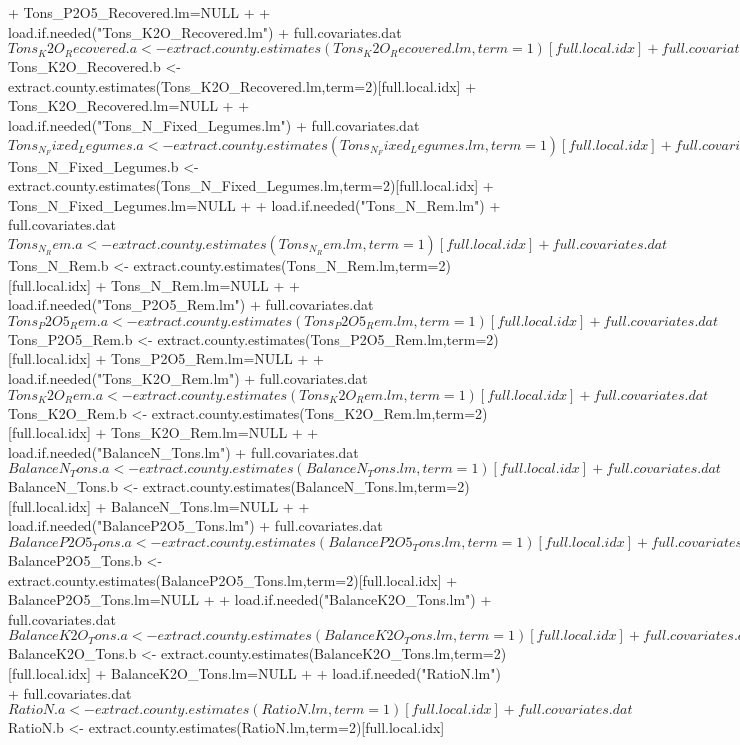 \documentclass{report}
\begin{document}
\begin{Schunk}
\begin{Sinput}
+    Tons_P2O5_Recovered.lm=NULL
+    
+    load.if.needed("Tons_K2O_Recovered.lm")
+    full.covariates.dat$Tons_K2O_Recovered.a <- extract.county.estimates(Tons_K2O_Recovered.lm,term=1)[full.local.idx]
+    full.covariates.dat$Tons_K2O_Recovered.b <- extract.county.estimates(Tons_K2O_Recovered.lm,term=2)[full.local.idx]
+    Tons_K2O_Recovered.lm=NULL
+    
+    load.if.needed("Tons_N_Fixed_Legumes.lm")
+    full.covariates.dat$Tons_N_Fixed_Legumes.a <- extract.county.estimates(Tons_N_Fixed_Legumes.lm,term=1)[full.local.idx]
+    full.covariates.dat$Tons_N_Fixed_Legumes.b <- extract.county.estimates(Tons_N_Fixed_Legumes.lm,term=2)[full.local.idx]
+    Tons_N_Fixed_Legumes.lm=NULL
+    
+    load.if.needed("Tons_N_Rem.lm")
+    full.covariates.dat$Tons_N_Rem.a <- extract.county.estimates(Tons_N_Rem.lm,term=1)[full.local.idx]
+    full.covariates.dat$Tons_N_Rem.b <- extract.county.estimates(Tons_N_Rem.lm,term=2)[full.local.idx]
+    Tons_N_Rem.lm=NULL
+    
+    load.if.needed("Tons_P2O5_Rem.lm")
+    full.covariates.dat$Tons_P2O5_Rem.a <- extract.county.estimates(Tons_P2O5_Rem.lm,term=1)[full.local.idx]
+    full.covariates.dat$Tons_P2O5_Rem.b <- extract.county.estimates(Tons_P2O5_Rem.lm,term=2)[full.local.idx]
+    Tons_P2O5_Rem.lm=NULL
+    
+    load.if.needed("Tons_K2O_Rem.lm")
+    full.covariates.dat$Tons_K2O_Rem.a <- extract.county.estimates(Tons_K2O_Rem.lm,term=1)[full.local.idx]
+    full.covariates.dat$Tons_K2O_Rem.b <- extract.county.estimates(Tons_K2O_Rem.lm,term=2)[full.local.idx]
+    Tons_K2O_Rem.lm=NULL
+    
+    load.if.needed("BalanceN_Tons.lm")
+    full.covariates.dat$BalanceN_Tons.a <- extract.county.estimates(BalanceN_Tons.lm,term=1)[full.local.idx]
+    full.covariates.dat$BalanceN_Tons.b <- extract.county.estimates(BalanceN_Tons.lm,term=2)[full.local.idx]
+    BalanceN_Tons.lm=NULL
+    
+    load.if.needed("BalanceP2O5_Tons.lm")
+    full.covariates.dat$BalanceP2O5_Tons.a <- extract.county.estimates(BalanceP2O5_Tons.lm,term=1)[full.local.idx]
+    full.covariates.dat$BalanceP2O5_Tons.b <- extract.county.estimates(BalanceP2O5_Tons.lm,term=2)[full.local.idx]
+    BalanceP2O5_Tons.lm=NULL
+    
+    load.if.needed("BalanceK2O_Tons.lm")
+    full.covariates.dat$BalanceK2O_Tons.a <- extract.county.estimates(BalanceK2O_Tons.lm,term=1)[full.local.idx]
+    full.covariates.dat$BalanceK2O_Tons.b <- extract.county.estimates(BalanceK2O_Tons.lm,term=2)[full.local.idx]
+    BalanceK2O_Tons.lm=NULL
+    
+    load.if.needed("RatioN.lm")
+    full.covariates.dat$RatioN.a <- extract.county.estimates(RatioN.lm,term=1)[full.local.idx]
+    full.covariates.dat$RatioN.b <- extract.county.estimates(RatioN.lm,term=2)[full.local.idx]

\end{Sinput}
\end{Schunk}
\end{document}
